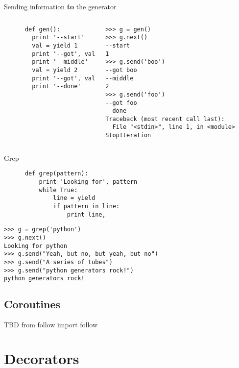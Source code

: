 \documentclass{beamer}
\begin{document}
\begin{frame}[fragile]{Sending information \textbf{to} the generator}
  \begin{columns}[t]
    \begin{verbatim}
      def gen():
        print '--start'
        val = yield 1
        print '--got', val
        print '--middle'
        val = yield 2
        print '--got', val
        print '--done'
    \end{verbatim}
    \pause
    \begin{verbatim}
>>> g = gen()
>>> g.next()
--start
1
>>> g.send('boo')
--got boo
--middle
2
>>> g.send('foo')
--got foo
--done
Traceback (most recent call last):
  File "<stdin>", line 1, in <module>
StopIteration
    \end{verbatim}
  \end{columns}
\end{frame}

\begin{frame}[fragile]{Grep}
    \begin{verbatim}
      def grep(pattern):
          print 'Looking for', pattern
          while True:
              line = yield
              if pattern in line:
                  print line,
    \end{verbatim}
    \pause
    \begin{verbatim}
>>> g = grep('python')
>>> g.next()
Looking for python
>>> g.send("Yeah, but no, but yeah, but no")
>>> g.send("A series of tubes")
>>> g.send("python generators rock!")
python generators rock!
    \end{verbatim}
\end{frame}

\subsection{Coroutines}

\begin{frame}{TBD}
  from follow import follow


\end{frame}

\section{Decorators}
\end{document}
